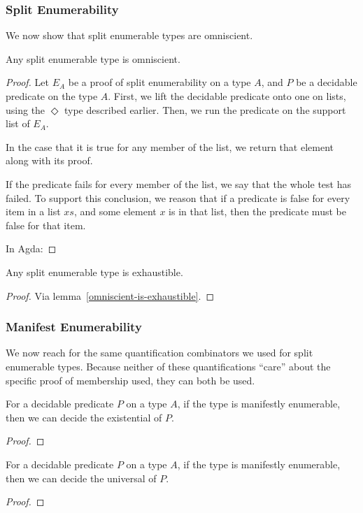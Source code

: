 \begin{refsection}
\subsubsection{Split Enumerability}
We now show that split enumerable types are omniscient.
\begin{theorem}
  Any split enumerable type is omniscient.
\end{theorem}
\begin{proof}
  Let \(E_A\) be a proof of split enumerability on a type \(A\), and \(P\) be a
  decidable predicate on the type \(A\).
  First, we lift the decidable predicate onto one on lists, using the
  \(\Diamond\) type described earlier.
  Then, we run the predicate on the support list of \(E_A\).

  In the case that it is true for any member of the list, we return that element
  along with its proof.

  If the predicate fails for every member of the list, we say that the whole
  test has failed.
  To support this conclusion, we reason that if a predicate is false for every
  item in a list \(\mathit{xs}\), and some element \(x\) is in that list, then
  the predicate must be false for that item.

  In Agda:
\end{proof}
\begin{theorem}
  Any split enumerable type is exhaustible.
\end{theorem}
\begin{proof}
  Via lemma~\ref{omniscient-is-exhaustible}.
\end{proof}

\subsubsection{Manifest Enumerability}
We now reach for the same quantification combinators we used for
split enumerable types.
Because neither of these quantifications ``care'' about the specific proof of
membership used, they can both be used.
\begin{theorem}
  For a decidable predicate \(P\) on a type \(A\), if the type is manifestly
  enumerable, then we can decide the existential of \(P\).
\end{theorem}
\begin{proof}
\end{proof}

\begin{theorem}
  For a decidable predicate \(P\) on a type \(A\), if the type is manifestly
  enumerable, then we can decide the universal of \(P\).
\end{theorem}
\begin{proof}
\end{proof}

\end{refsection}

